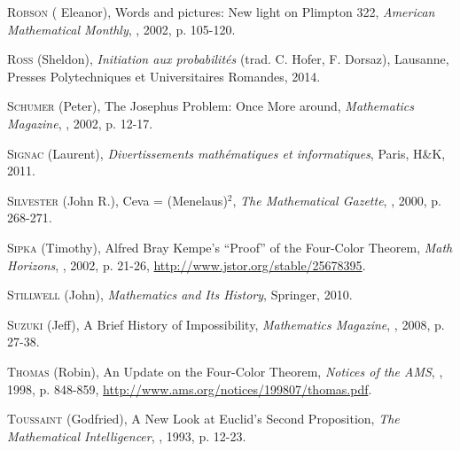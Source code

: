 \begin{thebibliography}{99}
 

 \textsc{Robson} ( Eleanor), \og Words and pictures: New light on {Plimpton} 322\fg,   \emph{American Mathematical Monthly}, , 2002, p. 105-120.


\textsc{Ross} (Sheldon), \emph{Initiation aux probabilités} (trad. C. Hofer, F. Dorsaz), Lausanne, Presses Polytechniques et Universitaires Romandes, 2014.



  \textsc{Schumer} (Peter), \og The {Josephus} Problem: Once More around\fg, \emph{Mathematics Magazine}, , 2002, p. 12-17.

\textsc{Signac} (Laurent), \emph{Divertissements mathématiques et informatiques}, Paris, H\&K, 2011.

  \textsc{Silvester} (John R.), \og Ceva = ({Menelaus})$^2$\fg, \emph{The Mathematical Gazette}, , 2000, p. 268-271.






  \textsc{Sipka} (Timothy), \og Alfred {Bray Kempe's} {``Proof''} of the Four-Color Theorem\fg, \emph{Math Horizons}, , 2002, p. 21-26, \url{http://www.jstor.org/stable/25678395}.





  \textsc{Stillwell} (John), \emph{Mathematics and Its History}, Springer, 2010.




  \textsc{Suzuki} (Jeff), \og A Brief History of Impossibility\fg, \emph{Mathematics Magazine}, , 2008, p. 27-38.

















  \textsc{Thomas} (Robin), \og An Update on the Four-Color Theorem\fg, \emph{Notices of the AMS}, , 1998, p. 848-859, \url{http://www.ams.org/notices/199807/thomas.pdf}.



  
  \textsc{Toussaint} (Godfried), \og A New Look at {Euclid's} Second Proposition\fg, \emph{The Mathematical Intelligencer}, , 1993, p. 12-23.





\end{thebibliography}
